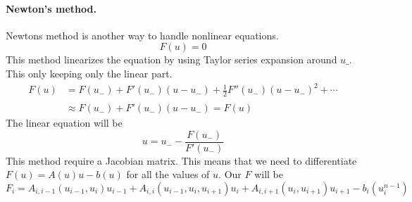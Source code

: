 \documentclass{article}
\begin{document}
\paragraph{Newton's method.}
Newtons method is another way to handle nonlinear equations. 
\begin{equation}
	F(u) = 0
\end{equation}
This method linearizes the equation by using Taylor series expansion around
$u\_$. This only keeping only the linear part.
\begin{align*}
	F(u) &= F(u_{-}) + F'(u_{-})(u - u_{-}) + \frac{1}{2}F''(u_{-})(u-u_{-})^2
	+\cdots  \\
	& \approx F(u_{-}) + F'(u_{-})(u - u_{-}) = \hat F(u)
\end{align*}
The linear equation will be
\begin{equation}
	u = u_{-} - \frac{F(u_{-})}{F'(u_{-})}
\end{equation}
This method require a Jacobian matrix. This means that we need to differentiate $F(u) = A(u)u - b(u)$ for all the 
values of $u$. Our $F$ will be
\begin{equation*}
F_i = A_{i,i-1}(u_{i-1},u_i)u_{i-1}+A_{i,i}(u_{i-1},u_{i},u_{i+1})u_{i}+A_{i,i+1}(u_i,u_{i+1})u_{i+1}-b_i(u^{n-1}_i)
\end{equation*}
\end{document}
